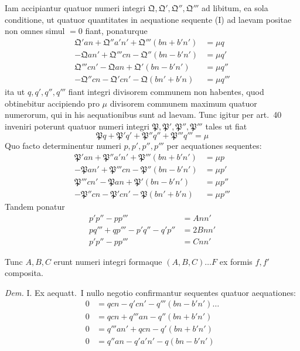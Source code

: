 \documentclass[12pt,a4paper]{article}
\theoremstyle{plain}
\theoremstyle{definition}
\theoremstyle{remark}
\theoremstyle{problemstyle}
\begin{document}
Iam accipiantur quatuor numeri integri $\mathfrak{Q}, \mathfrak{Q}', \mathfrak{Q}'', \mathfrak{Q}'''$ ad libitum, ea sola conditione, ut quatuor quantitates in aequatione sequente (I) ad laevam positae non omnes simul $=0$ fiant, ponaturque
\begin{align*}
\mathfrak{Q}'an + \mathfrak{Q}''a'n' + \mathfrak{Q}'''(bn + b'n') &= \mu q \tag{I} \\
-\mathfrak{Q}an' + \mathfrak{Q}'''cn - \mathfrak{Q}''(bn - b'n') &= \mu q' \\
\mathfrak{Q}'''cn' - \mathfrak{Q}an + \mathfrak{Q}'(bn - b'n') &= \mu q'' \\
-\mathfrak{Q}''cn - \mathfrak{Q}'cn' - \mathfrak{Q}(bn' + b'n) &= \mu q'''
\end{align*}
ita ut $q, q', q'', q'''$ fiant integri divisorem communem non habentes, quod obtinebitur accipiendo pro $\mu$ divisorem communem maximum quatuor numerorum, qui in his aequationibus sunt ad laevam. Tunc igitur per art.\ 40 inveniri poterunt quatuor numeri integri $\mathfrak{P}, \mathfrak{P}', \mathfrak{P}'', \mathfrak{P}'''$ tales ut fiat
\[
\mathfrak{P}q + \mathfrak{P}'q' + \mathfrak{P}''q'' + \mathfrak{P}'''q''' = \mu
\]
Quo facto determinentur numeri $p, p', p'', p'''$ per aequationes sequentes:
\begin{align*}
\mathfrak{P}'an + \mathfrak{P}''a'n' + \mathfrak{P}'''(bn + b'n') &= \mu p \tag{II} \\
-\mathfrak{P}an' + \mathfrak{P}'''cn - \mathfrak{P}''(bn - b'n') &= \mu p' \\
\mathfrak{P}'''cn' - \mathfrak{P}an + \mathfrak{P}'(bn - b'n') &= \mu p'' \\
-\mathfrak{P}''cn - \mathfrak{P}'cn' - \mathfrak{P}(bn' + b'n) &= \mu p'''
\end{align*}
Tandem ponatur
\begin{align*}
p'p'' - pp''' &= Ann' \\
pq''' + q p''' - p'q'' - q'p'' &= 2Bnn' \\
p'p'' - pp''' &= Cnn'
\end{align*}

Tunc $A, B, C$ erunt numeri integri formaque $(A, B, C) \ldots F$ ex formis $f, f'$ composita.

\emph{Dem.} I. Ex aequatt.\ I nullo negotio confirmantur sequentes quatuor aequationes:
\begin{align*}
0 &= qcn - q'cn' - q'''(bn - b'n') \ldots \tag{III} \\
0 &= qcn + q'''an - q''(bn + b'n') \\
0 &= q'''an' + qcn - q'(bn + b'n') \\
0 &= q''an - q'a'n' - q(bn - b'n')
\end{align*}
\end{document}
